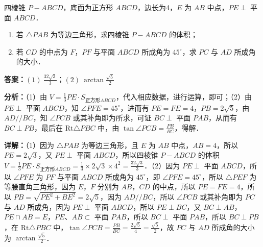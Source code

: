 \begin{question}[points=14]
四棱锥 $P-ABCD$，底面为正方形 $ABCD$，边长为4，$E$ 为 $AB$ 中点，$PE\perp$ 平面 $ABCD$．\begin{enumerate}\item[(1)] 若 $\triangle PAB$ 为等边三角形，求四棱锥 $P-ABCD$ 的体积；\item[(2)] 若 $CD$ 的中点为 $F$，$PF$ 与平面 $ABCD$ 所成角为 $45^\circ$，求 $PC$ 与 $AD$ 所成角的大小．\end{enumerate}
\begin{solution}
\textbf{答案：}$(1)\ \frac{32\sqrt{3}}{3}$；$(2)\ \arctan\frac{\sqrt{5}}{2}$

\textbf{分析：}（1）由 $V=\frac{1}{3}PE\cdot S_{\text{正方形}ABCD}$，代入相应数据，进行运算，即可；\newline（2）由 $PE\perp$ 平面 $ABCD$，知 $\angle PFE=45^\circ$，进而有 $PE=FE=4$，$PB=2\sqrt{5}$，由 $AD//BC$，知 $\angle PCB$ 或其补角即为所求，可证 $BC\perp$ 平面 $PAB$，从而有 $BC\perp PB$，最后在 $\text{Rt}\triangle PBC$ 中，由 $\tan\angle PCB=\frac{PB}{BC}$，得解．

\textbf{详解：}（1）因为 $\triangle PAB$ 为等边三角形，且 $E$ 为 $AB$ 中点，$AB=4$，所以 $PE=2\sqrt{3}$，又 $PE\perp$ 平面 $ABCD$，所以四棱锥 $P-ABCD$ 的体积 $V=\frac{1}{3}PE\cdot S_{\text{正方形}ABCD}=\frac{1}{3}\times 2\sqrt{3}\times 4^2=\frac{32\sqrt{3}}{3}$．\newline（2）因为 $PE\perp$ 平面 $ABCD$，所以 $\angle PFE$ 为 $PF$ 与平面 $ABCD$ 所成角为 $45^\circ$，即 $\angle PFE=45^\circ$，所以 $\triangle PEF$ 为等腰直角三角形，因为 $E$，$F$ 分别为 $AB$，$CD$ 的中点，所以 $PE=FE=4$，所以 $PB=\sqrt{PE^2+BE^2}=2\sqrt{5}$，因为 $AD//BC$，所以 $\angle PCB$ 或其补角即为 $PC$ 与 $AD$ 所成角，因为 $PE\perp$ 平面 $ABCD$，所以 $PE\perp BC$，又 $BC\perp AB$，$PE\cap AB=E$，$PE$、$AB\subset$ 平面 $PAB$，所以 $BC\perp$ 平面 $PAB$，所以 $BC\perp PB$，在 $\text{Rt}\triangle PBC$ 中，$\tan\angle PCB=\frac{PB}{BC}=\frac{2\sqrt{5}}{4}=\frac{\sqrt{5}}{2}$，故 $PC$ 与 $AD$ 所成角的大小为 $\arctan\frac{\sqrt{5}}{2}$．
\end{solution}
\end{question}

